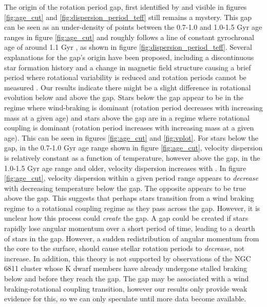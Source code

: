 The origin of the rotation period gap, first identified by
\citet{mcquillan2013} and visible in figures \ref{fig:age_cut} and
\ref{fig:dispersion_period_teff} still remains a mystery.
This gap can be seen as an under-density of points between the 0.7-1.0 and
1.0-1.5 Gyr age ranges in figure \ref{fig:age_cut} and roughly follows a line
of constant gyrochronal age of around 1.1 Gyr \citep[according to the
gyrochronology relation of][]{angus2019}, as shown in figure
\ref{fig:dispersion_period_teff}.
Several explanations for the gap's origin have been proposed, including a
discontinuous star formation history \citep{mcquillan2013, davenport2017,
davenport2018} and a change in magnetic field structure causing a brief period
where rotational variability is reduced and rotation periods cannot be
measured \citep{reinhold2019}.
Our results indicate there might be a slight difference in rotational
evolution below and above the gap.
Stars below the gap appear to be in the regime where wind-braking is dominant
(rotation period decreases with increasing mass at a given age) and stars
above the gap are in a regime where rotational coupling is dominant (rotation
period increases with increasing mass at a given age).
This can be seen in figures \ref{fig:age_cut} and \ref{fig:vplot}.
For stars below the gap, in the 0.7-1.0 Gyr age range shown in figure
\ref{fig:age_cut}, velocity dispersion is relatively constant as a function of
temperature, however above the gap, in the 1.0-1.5 Gyr age range and older,
velocity dispersion increases with \teff.
In figure \ref{fig:age_cut}, velocity dispersion within a given period range
appears to {\it decrease} with decreasing temperature below the gap.
The opposite appears to be true above the gap.
This suggests that perhaps stars transition from a wind braking regime to a
rotational coupling regime as they pass across the gap.
However, it is unclear how this process could {\it create} the gap.
A gap could be created if stars rapidly lose angular momentum over a short
period of time, leading to a dearth of stars in the gap.
However, a sudden redistribution of angular momentum from the core to the
surface, should cause stellar rotation periods to {\it decrease}, not
increase.
In addition, this theory is not supported by observations of the NGC 6811
cluster whose K dwarf members have already undergone stalled braking below and
before they reach the gap.
The gap may be associated with a wind braking-rotational coupling transition,
however our results only provide weak evidence for this, so we can only
speculate until more data become available.

